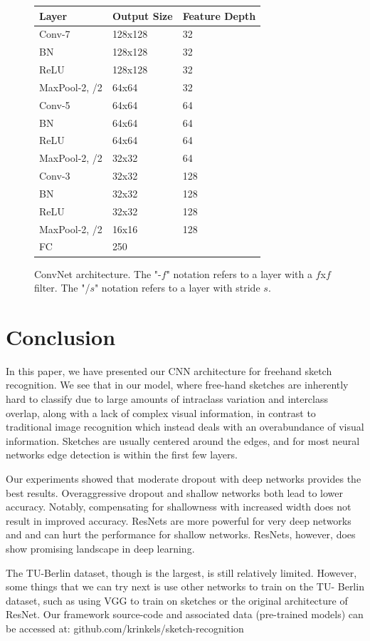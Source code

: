 \documentclass[10pt,twocolumn,letterpaper]{article}
\begin{document}
\begin{figure}[h]
\begin{center}
\begin{tabular}{l | l | l}
Layer & Output Size & Feature Depth \\ \hline \hline
Conv-7 & 128x128 & 32 \\
BN & 128x128 & 32 \\
ReLU & 128x128 & 32 \\
MaxPool-2, /2 & 64x64 & 32 \\ 
Conv-5 & 64x64 & 64 \\
BN & 64x64 & 64 \\
ReLU & 64x64 & 64 \\
MaxPool-2, /2 & 32x32 & 64 \\ 
Conv-3 & 32x32 & 128 \\
BN & 32x32 & 128 \\
ReLU & 32x32 & 128 \\
MaxPool-2, /2 & 16x16 & 128 \\
FC & 250 &
\end{tabular}
\caption{ConvNet architecture. The "-$f$" notation refers to a layer with a $f$x$f$ filter. The "/$s$" notation refers to a layer with stride $s$.}
\end{center}
\end{figure}

\section{Conclusion}

In this paper, we have presented our CNN architecture for freehand sketch recognition. We see that in our model, where free-hand sketches are inherently hard to classify due to large amounts of intraclass variation and interclass overlap, along with a lack of complex visual information, in contrast to traditional image recognition which instead deals with an overabundance of visual information. 
Sketches are usually centered around the edges, and for most neural networks edge detection is within the first few layers. 

Our experiments showed that moderate dropout with deep networks provides the best results. Overaggressive dropout and shallow networks both lead to lower accuracy. Notably, compensating for shallowness with increased width does not result in improved accuracy. 
ResNets are more powerful for very deep networks and and can hurt the performance for shallow networks. ResNets, however, does show promising landscape in deep learning. 

The TU-Berlin dataset, though is the largest, is still relatively limited. However, some things that we can try next is use other networks to train on the TU- Berlin dataset, such as using VGG to train on sketches or the original architecture of ResNet. Our framework source-code and associated data (pre-trained models) can be accessed at: github.com/krinkels/sketch-recognition

{\small


}
\end{document}
